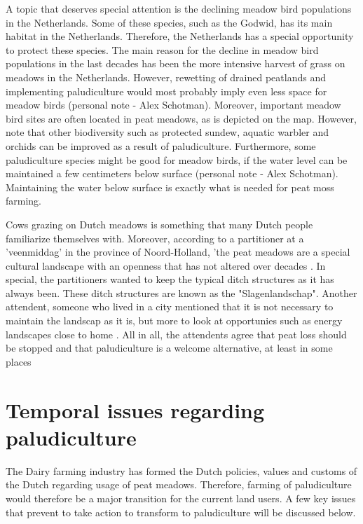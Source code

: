 {%
A topic that deserves special attention is the declining meadow bird populations in the Netherlands. Some of these species, such as the Godwid, has its main habitat in the Netherlands. Therefore, the Netherlands has a special opportunity to protect these species. The main reason for the decline in meadow bird populations in the last decades has been the more intensive harvest of grass on meadows in the Netherlands. However, rewetting of drained peatlands and implementing paludiculture would most probably imply even less space for meadow birds (personal note - Alex Schotman). Moreover, important meadow bird sites are often located in peat meadows, as is depicted on the map. However, note that other biodiversity such as protected sundew, aquatic warbler and orchids can be improved as a result of paludiculture. Furthermore, some paludiculture species might be good for meadow birds, if the water level can be maintained a few centimeters below surface (personal note - Alex Schotman). Maintaining the water below surface is exactly what is needed for peat moss farming.

Cows grazing on Dutch meadows is something that many Dutch people familiarize themselves with. Moreover, according to a partitioner at a 'veenmiddag' in the province of Noord-Holland, 'the peat meadows are a special cultural landscape with an openness that has not altered over decades \citep{Dosker2017}. In special, the partitioners wanted to keep the typical ditch structures as it has always been. These ditch structures are known as the "Slagenlandschap". Another attendent, someone who lived in a city mentioned that it is not necessary to maintain the landscap as it is, but more to look at opportunies such as energy landscapes close to home \citep{Dosker2017}. All in all, the attendents agree that peat loss should be stopped and that paludiculture is a welcome alternative, at least in some places \citep{Dosker2017}


\section{Temporal issues regarding paludiculture}

The Dairy farming industry has formed the Dutch policies, values and customs of the Dutch regarding usage of peat meadows. Therefore, farming of paludiculture would therefore be a major transition for the current land users. A few key issues that prevent to take action to transform to paludiculture will be discussed below.

}
